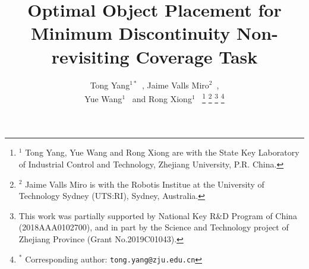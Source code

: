 \documentclass[letterpaper, 10pt, conference]{ieeeconf}
\begin{document}
%
\title{\LARGE \bf Optimal Object Placement for Minimum Discontinuity Non-revisiting Coverage Task}
%
%
%


\author{Tong Yang$^{1*}$~, Jaime Valls Miro$^2$~, \\Yue Wang$^{1}$~ and Rong Xiong$^1$~
\thanks{$^1$ Tong Yang, Yue Wang and Rong Xiong are with the State Key 
Laboratory of Industrial Control and Technology, Zhejiang University, P.R. China. 
}
\thanks{$^2$ Jaime Valls Miro is with the Robotis Institue at the University of Technology Sydney (UTS:RI), Sydney, Australia.}
\thanks{This work was partially supported by National Key R\&D Program of China (2018AAA0102700), and in part by the Science and Technology project of Zhejiang Province (Grant No.2019C01043).}
\thanks{$^*$ Corresponding author: {\tt\small tong.yang@zju.edu.cn}}
}
\end{document}
